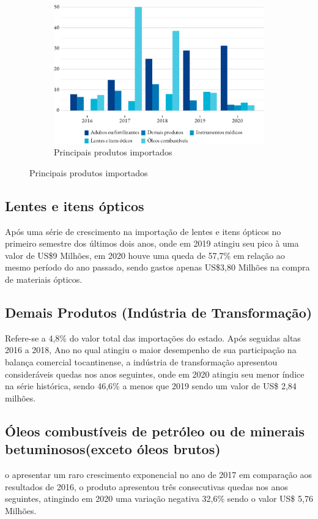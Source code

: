 \begin{figure}[!h]
	\begin{subfigure}{\linewidth}
		\caption{Principais produtos importados}
		\includegraphics{fig/produtos_import-1.pdf}
	\end{subfigure}
\end{figure}


\subsection{Lentes e itens ópticos}
\par Após uma série de crescimento na importação de lentes e itens ópticos no primeiro semestre dos últimos dois anos, onde em 2019 atingiu seu pico à uma valor de US\$9 Milhões, em 2020 houve uma queda de 57,7\% em relação ao mesmo período do ano passado, sendo gastos apenas US\$3,80 Milhões na compra de materiais ópticos. 

\subsection{Demais Produtos (Indústria de Transformação)}
\par Refere-se a 4,8\% do valor total das importações do estado. Após seguidas altas 2016 a 2018, Ano no qual atingiu o maior desempenho de sua participação na balança comercial tocantinense, a indústria de transformação apresentou consideráveis quedas nos anos seguintes, onde em 2020 atingiu seu menor índice na série histórica, sendo 46,6\% a menos que 2019 sendo um valor de US\$ 2,84 milhões. 

\subsection{Óleos combustíveis de petróleo ou de minerais betuminosos(exceto óleos brutos)}
\par o apresentar um raro crescimento exponencial no ano de 2017 em comparação aos resultados de 2016, o produto apresentou três consecutivas quedas nos anos seguintes, atingindo em 2020 uma variação negativa 32,6\% sendo o valor US\$ 5,76 Milhões.


